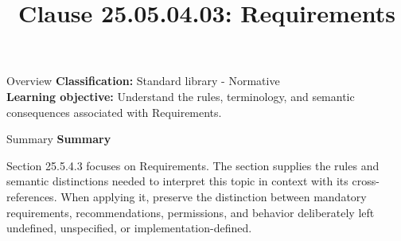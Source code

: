 \documentclass[10pt,letterpaper]{article}
\title{Clause 25.05.04.03: Requirements}
\author{}
\date{}
\begin{document}
\maketitle
\begin{CornellOverviewBox}{Overview}
\textbf{Classification:} Standard library - Normative\\[2pt]
\textbf{Learning objective:} Understand the rules, terminology, and semantic consequences associated with Requirements.
\end{CornellOverviewBox}\begin{CornellSummaryBox}{Summary}
{\sffamily\bfseries\color{Accent} Summary}\par\vspace{3pt}Section 25.5.4.3 focuses on Requirements. The section supplies the rules and semantic distinctions needed to interpret this topic in context with its cross-references. When applying it, preserve the distinction between mandatory requirements, recommendations, permissions, and behavior deliberately left undefined, unspecified, or implementation-defined.
\end{CornellSummaryBox}
\end{document}
